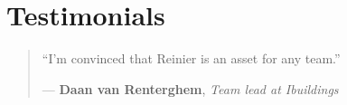 \documentclass[a4paper,10pt]{article}
\begin{document}








          \section{Testimonials}

            \vspace{5pt}

            \begin{quote}
              “I'm convinced that Reinier is an asset for any team.”

              — \textbf{Daan van Renterghem}, \textit{Team lead at Ibuildings}
            \end{quote}
\end{document}
